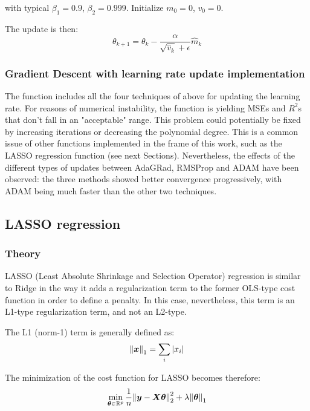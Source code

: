 \documentclass[11pt,a4paper,twocolumn]{article}
\let\oldtexttt\texttt
\renewcommand{\texttt}[1]{\tcbox{\oldtexttt{#1}}}
\begin{document}
with typical $\beta_1 = 0.9$, $\beta_2 = 0.999$. Initialize $m_0 = 0$, $v_0 = 0$.

The update is then:
\begin{equation}
	\theta_{k+1} =\theta_k -\frac{\alpha}{\sqrt{\hat{v}_k} + \epsilon}\hat{m}_k
\end{equation}

\subsubsection{Gradient Descent with learning rate update implementation}
The function \texttt{theta\_gd\_mom} includes all the four techniques of above for updating the learning rate. For reasons of numerical instability, the function is yielding MSEs and $R^2$s that don't fall in an "acceptable" range. This problem could potentially be fixed by increasing iterations or decreasing the polynomial degree. This is a common issue of other functions implemented in the frame of this work, such as the LASSO regression function (see next Sections). Nevertheless, the effects of the different types of updates between AdaGRad, RMSProp and ADAM have been observed: the three methods showed better convergence progressively, with ADAM being much faster than the other two techniques.


\subsection{LASSO regression}
\subsubsection{Theory}
LASSO (Least Absolute Shrinkage and Selection Operator) regression is similar to Ridge in the way it adds a regularization term to the former OLS-type cost function in order to define a penalty. In this case, nevertheless, this term is an L1-type regularization term, and not an L2-type.

The L1 (norm-1) term is generally defined as:
\begin{equation}
	\norm{\boldsymbol{x}}_1 = \sum_i \abs{x_i}
\end{equation}

The minimization of the cost function for LASSO becomes therefore:
\begin{equation}
	\min_{\boldsymbol{\theta} \in \mathbb{R}^{p}}
	\frac{1}{n} \norm{\boldsymbol{y} - \boldsymbol{X}\boldsymbol{\theta}}_2^2
	+ \lambda\norm{\boldsymbol{\theta}}_1
\end{equation}
\end{document}
